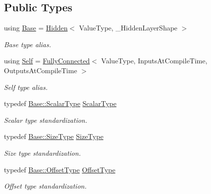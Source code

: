 \subsection*{Public Types}
\begin{DoxyCompactItemize}
\item 
using \hyperlink{classffnn_1_1layer_1_1_fully_connected_ad49d4e88823497be658d01c44eeef3f2}{Base} = \hyperlink{classffnn_1_1layer_1_1_hidden}{Hidden}$<$ Value\-Type, \-\_\-\-Hidden\-Layer\-Shape $>$
\begin{DoxyCompactList}\small\item\em Base type alias. \end{DoxyCompactList}\item 
using \hyperlink{classffnn_1_1layer_1_1_fully_connected_ac41b1867a1a4e8c9c9eaa892db2ab805}{Self} = \hyperlink{classffnn_1_1layer_1_1_fully_connected}{Fully\-Connected}$<$ Value\-Type, Inputs\-At\-Compile\-Time, Outputs\-At\-Compile\-Time $>$
\begin{DoxyCompactList}\small\item\em Self type alias. \end{DoxyCompactList}\item 
typedef \hyperlink{classffnn_1_1layer_1_1internal_1_1_interface_a7f834e3365e5199bcbcd16d9abd63941}{Base\-::\-Scalar\-Type} \hyperlink{classffnn_1_1layer_1_1_fully_connected_aa5e1875ec3ea63c90655419e7dd32a55}{Scalar\-Type}
\begin{DoxyCompactList}\small\item\em Scalar type standardization. \end{DoxyCompactList}\item 
typedef \hyperlink{classffnn_1_1layer_1_1_hidden_ac148012cb544a39841675601090cd4c8}{Base\-::\-Size\-Type} \hyperlink{classffnn_1_1layer_1_1_fully_connected_a2924c85b3cc3e79db3f271cd22cac32c}{Size\-Type}
\begin{DoxyCompactList}\small\item\em Size type standardization. \end{DoxyCompactList}\item 
typedef \hyperlink{classffnn_1_1layer_1_1_hidden_ae2409b970adafb0ebc9b2eec62c4aac4}{Base\-::\-Offset\-Type} \hyperlink{classffnn_1_1layer_1_1_fully_connected_a0f5ae1a0bd038f404410ce2af1054833}{Offset\-Type}
\begin{DoxyCompactList}\small\item\em Offset type standardization. \end{DoxyCompactList}\item 

\end{DoxyCompactItemize}
